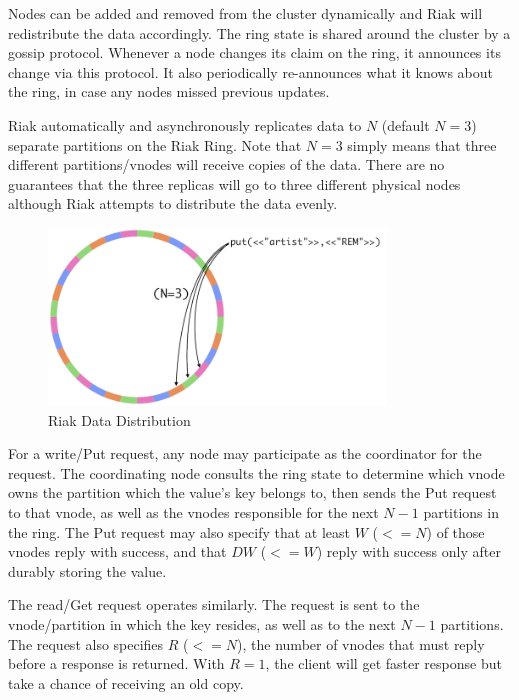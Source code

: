 \documentclass[11pt]{book}
\begin{document}
Nodes can be added and removed from the cluster dynamically and Riak will redistribute the data accordingly. The ring state is shared around the cluster by a gossip protocol. Whenever a node changes its claim on the ring, it announces its change via this protocol. It also periodically re-announces what it knows about the ring, in case any nodes missed previous updates.

Riak automatically and asynchronously replicates data to $N$ (default $N=3$) separate partitions on the Riak Ring. Note that $N=3$ simply means that three different partitions/vnodes will receive copies of the data. There are no guarantees that the three replicas will go to three different physical nodes although Riak attempts to distribute the data evenly.

\begin{figure}[t]
\includegraphics[width=0.8\textwidth]{images/riak-data-distribution.png}
\centering
\caption{Riak Data Distribution}
\end{figure}

For a write/Put request, any node may participate as the coordinator for the request. The coordinating node consults the ring state to determine which vnode owns the partition which the value's key belongs to, then sends the Put request to that vnode, as well as the vnodes responsible for the next $N-1$ partitions in the ring. The Put request may also specify that at least $W$ ($<= N$) of those vnodes reply with success, and that $DW$ ($<= W$) reply with success only after durably storing the value. 

The read/Get request operates similarly. The request is sent to the vnode/partition in which the key resides, as well as to the next $N-1$ partitions. The request also specifies $R$ ($<= N$), the number of vnodes that must reply before a response is returned. With $R=1$, the client will get faster response but take a chance of receiving an old copy.
\end{document}
